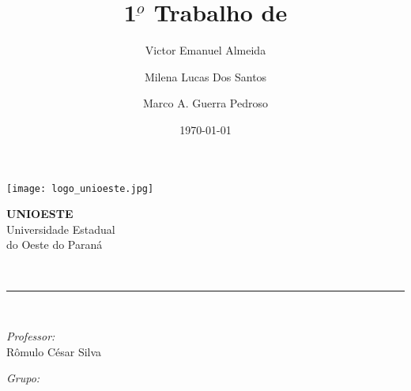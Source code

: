 \documentclass[12pt, a4paper]{article}
\author{Victor Emanuel Almeida\and Milena Lucas Dos Santos\and Marco A. Guerra Pedroso}
\title{1$^{\underbar{o}}$ Trabalho de \materia}
\date{\today}
\newcommand{\prof}{Rômulo César Silva}
\begin{document}
\begin{titlepage}
    \centering
    \thispagestyle{fancy}

    \begin{minipage}{0.4\textwidth}
        \begin{flushleft}
            \texttt{[image: logo\_unioeste.jpg]}\\[1.0 cm]
        \end{flushleft}
    \end{minipage}
    \begin{minipage}{0.5\textwidth}
        \begin{flushright}\large
            \textsc{\LARGE\textbf{UNIOESTE}}\\
            \vspace{1cm}
            Universidade Estadual\\do Oeste do Paraná
        \end{flushright}
    \end{minipage}
    \vspace*{4.5 cm}

    {\huge\bfseries\thetitle}\\
    \rule{\linewidth}{0.2 mm}\\[1.5 cm]

    \vspace{2cm}
    \begin{minipage}[t]{0.4\textwidth}
        \begin{flushleft}\large
            \emph{Professor:}\\
            \prof\\
        \end{flushleft}
    \end{minipage}
    \begin{minipage}[t]{0.5\textwidth}

        \begin{flushright}\large
            \emph{Grupo:}\\
            \theauthor
        \end{flushright}

    \end{minipage}\\[2 cm]

    \vfill\thedate
\end{titlepage}

\pagestyle{fancy}
\fancyfoot[L]{}
\fancyhead[L]{}
\fancyhead[R]{}
\end{document}
